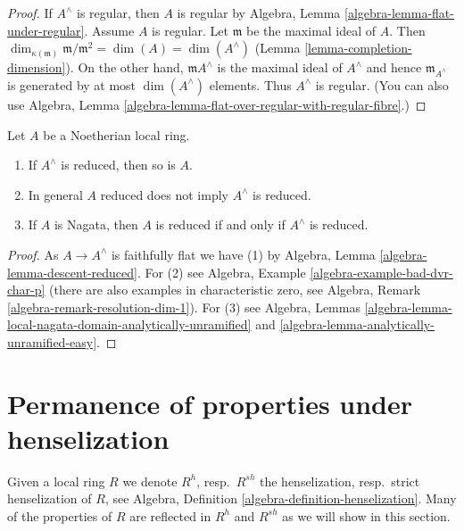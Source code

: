 \begin{proof}
If $A^\wedge$ is regular, then $A$ is regular by
Algebra, Lemma \ref{algebra-lemma-flat-under-regular}.
Assume $A$ is regular. Let $\mathfrak m$ be the maximal ideal
of $A$. Then $\dim_{\kappa(\mathfrak m)} \mathfrak m/\mathfrak m^2 =
\dim(A) = \dim(A^\wedge)$ (Lemma \ref{lemma-completion-dimension}).
On the other hand, $\mathfrak mA^\wedge$ is the maximal ideal of
$A^\wedge$ and hence $\mathfrak m_{A^\wedge}$
is generated by at most $\dim(A^\wedge)$ elements. Thus $A^\wedge$ is regular.
(You can also use
Algebra, Lemma \ref{algebra-lemma-flat-over-regular-with-regular-fibre}.)
\end{proof}

\begin{lemma}
\label{lemma-completion-reduced}
Let $A$ be a Noetherian local ring.
\begin{enumerate}
\item If $A^\wedge$ is reduced, then so is $A$.
\item In general $A$ reduced does not imply $A^\wedge$ is reduced.
\item If $A$ is Nagata, then $A$ is reduced if and only if $A^\wedge$
is reduced.
\end{enumerate}
\end{lemma}

\begin{proof}
As $A \to A^\wedge$ is faithfully flat we have (1) by
Algebra, Lemma \ref{algebra-lemma-descent-reduced}.
For (2) see Algebra, Example \ref{algebra-example-bad-dvr-char-p}
(there are also examples in characteristic zero, see
Algebra, Remark \ref{algebra-remark-resolution-dim-1}).
For (3) see Algebra, Lemmas
\ref{algebra-lemma-local-nagata-domain-analytically-unramified} and
\ref{algebra-lemma-analytically-unramified-easy}.
\end{proof}







\section{Permanence of properties under henselization}
\label{section-permanence-henselization}

\noindent
Given a local ring $R$ we denote $R^h$, resp.\ $R^{sh}$ the henselization,
resp.\ strict henselization of $R$, see
Algebra, Definition \ref{algebra-definition-henselization}.
Many of the properties of $R$ are
reflected in $R^h$ and $R^{sh}$ as we will show in this section.

